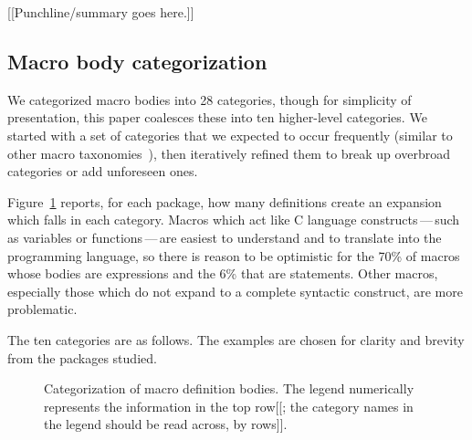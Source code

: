 \documentclass[10pt]{article}
\begin{document}
[[Punchline/summary goes here.]]



\subsection{Macro body categorization}

We categorized macro bodies into 28 categories, though for simplicity of
presentation, this paper coalesces these into ten higher-level categories.
We started with a set of categories that we expected to occur frequently
(similar to other macro
taxonomies~\cite{Stroustrup-DesignEvolution,Carroll95}), then iteratively
refined them to break up overbroad categories or add unforeseen ones.

Figure~\ref{fig:categorization} reports, for each package, how many
definitions create an expansion which falls in each category.  Macros which
act like C language constructs\,---\,such as variables or
functions\,---\,are easiest to understand and to translate into the
programming language, so there is reason to be optimistic for the 70\% of
macros whose bodies are expressions and the 6\% that are statements.  Other
macros, especially those which do not expand to a complete syntactic
construct, are more problematic.


The ten categories are as follows.  The examples are chosen for clarity
and brevity from the packages studied.


\begin{figure}
\centerline{}
\caption{Categorization of macro definition bodies.  The legend numerically
  represents the information in the top row[[; the category names in the
  legend should be read across, by rows]].}
\label{fig:categorization}
\end{figure}


{}


\end{document}
